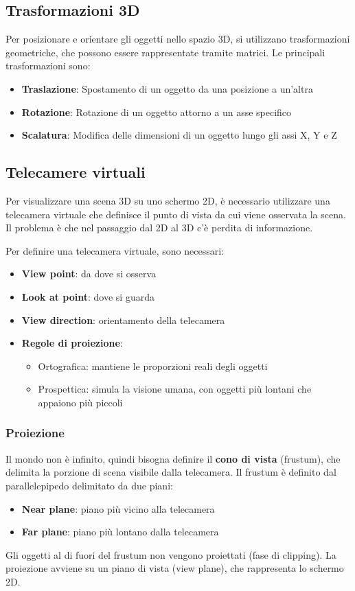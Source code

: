 \documentclass[a4paper]{article}
\begin{document}
\subsection{Trasformazioni 3D}
Per posizionare e orientare gli oggetti nello spazio 3D, si utilizzano trasformazioni
geometriche, che possono essere rappresentate tramite matrici. Le principali trasformazioni sono:
\begin{itemize}
  \item \textbf{Traslazione}: Spostamento di un oggetto da una posizione a un'altra
  \item \textbf{Rotazione}: Rotazione di un oggetto attorno a un asse specifico
  \item \textbf{Scalatura}: Modifica delle dimensioni di un oggetto lungo gli assi
    X, Y e Z
\end{itemize}

\subsection{Telecamere virtuali}
Per visualizzare una scena 3D su uno schermo 2D, è necessario utilizzare
una telecamera virtuale che definisce il punto di vista da cui viene osservata la scena.
Il problema è che nel passaggio dal 2D al 3D c'è perdita di informazione.

Per definire una telecamera virtuale, sono necessari:
\begin{itemize}
  \item \textbf{View point}: da dove si osserva
  \item \textbf{Look at point}: dove si guarda
  \item \textbf{View direction}: orientamento della telecamera
  \item \textbf{Regole di proiezione}:
    \begin{itemize}
      \item Ortografica: mantiene le proporzioni reali degli oggetti
      \item Prospettica: simula la visione umana, con oggetti
        più lontani che appaiono più piccoli
    \end{itemize}
\end{itemize}

\subsubsection{Proiezione}
Il mondo non è infinito, quindi bisogna definire il \textbf{cono di vista} (frustum),
che delimita la porzione di scena visibile dalla telecamera. Il frustum è definito
dal parallelepipedo delimitato da due piani:
\begin{itemize}
  \item \textbf{Near plane}: piano più vicino alla telecamera
  \item \textbf{Far plane}: piano più lontano dalla telecamera
\end{itemize}
Gli oggetti al di fuori del frustum non vengono proiettati (fase di clipping). La proiezione
avviene su un piano di vista (view plane), che rappresenta lo schermo 2D.
\end{document}
